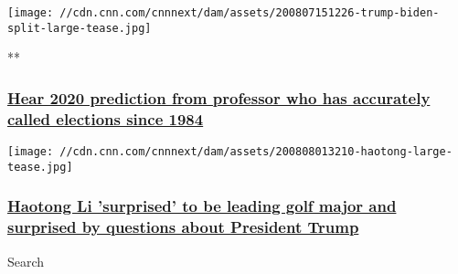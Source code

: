 \href{/videos/politics/2020/08/08/allan-lichtman-2020-predicts-trump-loses-to-biden-smerconish-sot.cnn}{}

\texttt{[image: //cdn.cnn.com/cnnnext/dam/assets/200807151226-trump-biden-split-large-tease.jpg]}

**

\hypertarget{hear-2020-prediction-from-professor-who-has-accurately-called-elections-since-1984}{%
\subsubsection{\texorpdfstring{\href{/videos/politics/2020/08/08/allan-lichtman-2020-predicts-trump-loses-to-biden-smerconish-sot.cnn}{Hear
2020 prediction from professor who has accurately called elections since
1984}}{Hear 2020 prediction from professor who has accurately called elections since 1984}}\label{hear-2020-prediction-from-professor-who-has-accurately-called-elections-since-1984}}

\href{/2020/08/08/golf/golf-pga-haotong-trump-koepka-woods-spt-intl/index.html}{}

\texttt{[image: //cdn.cnn.com/cnnnext/dam/assets/200808013210-haotong-large-tease.jpg]}

\hypertarget{haotong-li-surprised-to-be-leading-golf-major-and-surprised-by-questions-about-president-trump}{%
\subsubsection{\texorpdfstring{\href{/2020/08/08/golf/golf-pga-haotong-trump-koepka-woods-spt-intl/index.html}{Haotong
Li 'surprised' to be leading golf major and surprised by questions about
President
Trump}}{Haotong Li 'surprised' to be leading golf major and surprised by questions about President Trump}}\label{haotong-li-surprised-to-be-leading-golf-major-and-surprised-by-questions-about-president-trump}}

Search

